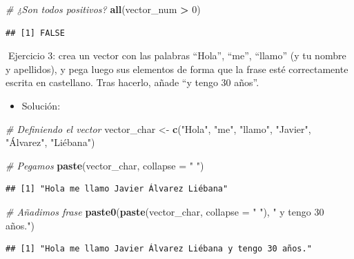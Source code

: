\documentclass[11pt,]{book}
\newenvironment{Shaded}{\begin{snugshade}}{\end{snugshade}}
\newcommand{\CommentTok}[1]{\textcolor[rgb]{0.37,0.37,0.37}{\textit{#1}}}
\newcommand{\DataTypeTok}[1]{\textcolor[rgb]{0.27,0.27,0.27}{#1}}
\newcommand{\DecValTok}[1]{\textcolor[rgb]{0.06,0.06,0.06}{#1}}
\newcommand{\KeywordTok}[1]{\textcolor[rgb]{0.27,0.27,0.27}{\textbf{#1}}}
\newcommand{\NormalTok}[1]{#1}
\newcommand{\OperatorTok}[1]{\textcolor[rgb]{0.43,0.43,0.43}{\textbf{#1}}}
\newcommand{\StringTok}[1]{\textcolor[rgb]{0.5,0.5,0.5}{#1}}
\providecommand{\tightlist}{%
  \setlength{\itemsep}{0pt}\setlength{\parskip}{0pt}}
\begin{document}
\begin{Shaded}
\begin{Highlighting}[]
\CommentTok{# ¿Son todos positivos?}
\KeywordTok{all}\NormalTok{(vector_num }\OperatorTok{>}\StringTok{ }\DecValTok{0}\NormalTok{)}
\end{Highlighting}
\end{Shaded}

\begin{verbatim}
## [1] FALSE
\end{verbatim}

📝Ejercicio 3: crea un vector con las palabras ``Hola'', ``me'', ``llamo'' (y tu nombre y apellidos), y pega luego sus elementos de forma que la frase esté correctamente escrita en castellano. Tras hacerlo, añade ``y tengo 30 años''.

\begin{itemize}
\tightlist
\item
  Solución:
\end{itemize}

\begin{Shaded}
\begin{Highlighting}[]
\CommentTok{# Definiendo el vector}
\NormalTok{vector_char <-}\StringTok{ }\KeywordTok{c}\NormalTok{(}\StringTok{"Hola"}\NormalTok{, }\StringTok{"me"}\NormalTok{, }\StringTok{"llamo"}\NormalTok{, }\StringTok{"Javier"}\NormalTok{,}
                 \StringTok{"Álvarez"}\NormalTok{, }\StringTok{"Liébana"}\NormalTok{)}

\CommentTok{# Pegamos}
\KeywordTok{paste}\NormalTok{(vector_char, }\DataTypeTok{collapse =} \StringTok{" "}\NormalTok{)}
\end{Highlighting}
\end{Shaded}

\begin{verbatim}
## [1] "Hola me llamo Javier Álvarez Liébana"
\end{verbatim}

\begin{Shaded}
\begin{Highlighting}[]
\CommentTok{# Añadimos frase}
\KeywordTok{paste0}\NormalTok{(}\KeywordTok{paste}\NormalTok{(vector_char, }\DataTypeTok{collapse =} \StringTok{" "}\NormalTok{), }\StringTok{" y tengo 30 años."}\NormalTok{)}
\end{Highlighting}
\end{Shaded}

\begin{verbatim}
## [1] "Hola me llamo Javier Álvarez Liébana y tengo 30 años."
\end{verbatim}
\end{document}

